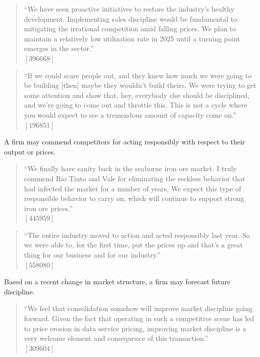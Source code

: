 \begin{quote}
``We have seen proactive initiatives to restore the industry's healthy development. Implementing sales discipline would be fundamental to mitigating the irrational competition amid falling prices. We plan to maintain a relatively low utilization rate in 2025 until a turning point emerges in the sector.'' \\
$[396668]$
\end{quote}

\begin{quote}
``If we could scare people out, and they knew how much we were going to be building [then] maybe they wouldn't build theirs. We were trying to get some attention and show that, hey, everybody else should be disciplined, and we're going to come out and throttle this. This is not a cycle where you would expect to see a tremendous amount of capacity come on.'' \\
$[196851]$
\end{quote}

A firm may commend competitors for acting responsibly with respect to their output or prices.

\begin{quote}
``We finally have sanity back in the seaborne iron ore market. I truly commend Rio Tinto and Vale for eliminating the reckless behavior that had infected the market for a number of years. We expect this type of responsible behavior to carry on, which will continue to support strong iron ore prices.'' \\
$[445959]$
\end{quote}

\begin{quote}
``The entire industry moved to action and acted responsibly last year. So we were able to, for the first time, put the prices up and that's a great thing for our business and for our industry.'' \\
$[558080]$
\end{quote}

Based on a recent change in market structure, a firm may forecast future discipline.

\begin{quote}
``We feel that consolidation somehow will improve market discipline going forward. Given the fact that operating in such a competitive scene has led to price erosion in data service pricing, improving market discipline is a very welcome element and consequence of this transaction.'' \\
$[309604]$
\end{quote}

